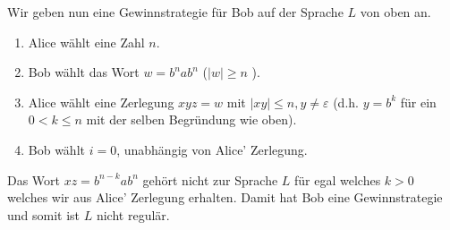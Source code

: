 \documentclass[11pt, a4paper]{article}
\theoremstyle{definition}
\theoremstyle{plain}
\begin{document}
Wir geben nun eine Gewinnstrategie für Bob auf der Sprache $L$ von oben an.\par
\begin{enumerate}[label=\arabic*)]
	\item Alice wählt eine Zahl $n$.
	\item Bob wählt das Wort $w = b^n a b^n$ ($\left| w \right| \geq n$ \checkmark).
	\item Alice wählt eine Zerlegung $xyz = w$ mit $\left| xy \right| \leq n, y \neq \varepsilon$ (d.h. $y = b^k$ für ein $0 < k \leq n$ mit der selben Begründung wie oben).
	\item Bob wählt $i = 0$, unabhängig von Alice' Zerlegung.
\end{enumerate}
Das Wort $xz = b^{n-k} a b^n$ gehört nicht zur Sprache $L$ für egal welches $k > 0$ welches wir aus Alice' Zerlegung erhalten. Damit hat Bob eine Gewinnstrategie und somit ist $L$ nicht regulär.
\end{document}
